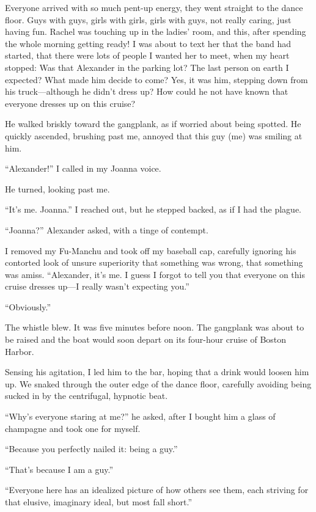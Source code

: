 Everyone arrived with so much pent-up energy, they went straight to the
dance floor. Guys with guys, girls with girls, girls with guys, not
really caring, just having fun. Rachel was touching up in the ladies'
room, and this, after spending the whole morning getting ready! I was
about to text her that the band had started, that there were lots of
people I wanted her to meet, when my heart stopped: Was that Alexander
in the parking lot? The last person on earth I expected? What made him
decide to come? Yes, it was him, stepping down from his truck---although
he didn't dress up? How could he not have known that everyone dresses up
on this cruise?

He walked briskly toward the gangplank, as if worried about being
spotted. He quickly ascended, brushing past me, annoyed that this guy
(me) was smiling at him.

``Alexander!'' I called in my Joanna voice.

He turned, looking past me.

``It's me. Joanna.'' I reached out, but he stepped backed, as if I had
the plague.

``Joanna?'' Alexander asked, with a tinge of contempt.

I removed my Fu-Manchu and took off my baseball cap, carefully ignoring
his contorted look of unsure superiority that something was wrong, that
something was amiss. ``Alexander, it's me. I guess I forgot to tell you
that everyone on this cruise dresses up---I really wasn't expecting
you.''

``Obviously.''

The whistle blew. It was five minutes before noon. The gangplank was
about to be raised and the boat would soon depart on its four-hour
cruise of Boston Harbor.

Sensing his agitation, I led him to the bar, hoping that a drink would
loosen him up. We snaked through the outer edge of the dance floor,
carefully avoiding being sucked in by the centrifugal, hypnotic beat.

``Why's everyone staring at me?'' he asked, after I bought him a glass
of champagne and took one for myself.

``Because you perfectly nailed it: being a guy.''

``That's because I am a guy.''

``Everyone here has an idealized picture of how others see them, each
striving for that elusive, imaginary ideal, but most fall short.''

